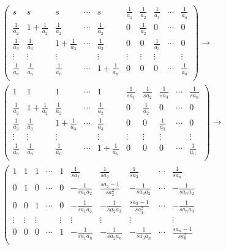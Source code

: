 \documentclass[../../main.tex]{subfiles}%
\begin{document}
\begin{solution}
\begin{gather*}
\left( \begin{matrix}
s&		s&		s&		\cdots&		s&		\frac{1}{a_1}&		\frac{1}{a_2}&		\frac{1}{a_3}&		\cdots&		\frac{1}{a_n}\\
\frac{1}{a_2}&		1+\frac{1}{a_2}&		\frac{1}{a_2}&		\cdots&		\frac{1}{a_2}&		0&		\frac{1}{a_2}&		0&		\cdots&		0\\
\frac{1}{a_3}&		\frac{1}{a_3}&		1+\frac{1}{a_3}&		\cdots&		\frac{1}{a_3}&		0&		0&		\frac{1}{a_3}&		\cdots&		0\\
\vdots&		\vdots&		\vdots&		&		\vdots&		\vdots&		\vdots&		\vdots&		&		\vdots\\
\frac{1}{a_n}&		\frac{1}{a_n}&		\frac{1}{a_n}&		\cdots&		1+\frac{1}{a_n}&		0&		0&		0&		\cdots&		\frac{1}{a_n}\\
\end{matrix} \right) \rightarrow 
\\
\left( \begin{matrix}
1&		1&		1&		\cdots&		1&		\frac{1}{sa_1}&		\frac{1}{sa_2}&		\frac{1}{sa_3}&		\cdots&		\frac{1}{sa_n}\\
\frac{1}{a_2}&		1+\frac{1}{a_2}&		\frac{1}{a_2}&		\cdots&		\frac{1}{a_2}&		0&		\frac{1}{a_2}&		0&		\cdots&		0\\
\frac{1}{a_3}&		\frac{1}{a_3}&		1+\frac{1}{a_3}&		\cdots&		\frac{1}{a_3}&		0&		0&		\frac{1}{a_3}&		\cdots&		0\\
\vdots&		\vdots&		\vdots&		&		\vdots&		\vdots&		\vdots&		\vdots&		&		\vdots\\
\frac{1}{a_n}&		\frac{1}{a_n}&		\frac{1}{a_n}&		\cdots&		1+\frac{1}{a_n}&		0&		0&		0&		\cdots&		\frac{1}{a_n}\\
\end{matrix} \right) \rightarrow 
\\
\left( \begin{matrix}
1&		1&		1&		\cdots&		1&		\frac{1}{sa_1}&		\frac{1}{sa_2}&		\frac{1}{sa_3}&		\cdots&		\frac{1}{sa_n}\\
0&		1&		0&		\cdots&		0&		-\frac{1}{sa_1a_2}&		\frac{sa_2-1}{sa_{2}^{2}}&		-\frac{1}{sa_3a_2}&		\cdots&		-\frac{1}{sa_na_2}\\
0&		0&		1&		\cdots&		0&		-\frac{1}{sa_1a_3}&		-\frac{1}{sa_2a_3}&		\frac{sa_3-1}{sa_{3}^{2}}&		\cdots&		-\frac{1}{sa_na_3}\\
\vdots&		\vdots&		\vdots&		&		\vdots&		\vdots&		\vdots&		\vdots&		&		\vdots\\
0&		0&		0&		\cdots&		1&		-\frac{1}{sa_1a_n}&		-\frac{1}{sa_2a_n}&		-\frac{1}{sa_3a_n}&		\cdots&		\frac{sa_n-1}{sa_{n}^{2}}\\

\end{matrix}
\end{gather*}
\end{solution}
\end{document}
